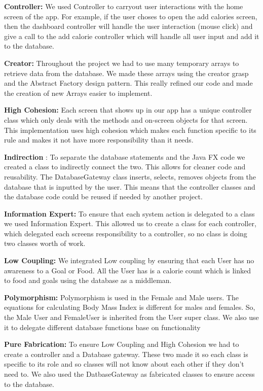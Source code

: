 \documentclass[10pt]{article}
\begin{document}
\textbf{Controller:} We used Controller to carryout user interactions
with the home screen of the app. For example, if the user choses to open
the add calories screen, then the dashboard controller will handle the
user interaction (mouse click) and give a call to the add calorie
controller which will handle all user input and add it to the database.

\textbf{Creator:} Throughout the project we had to use many temporary
arrays to retrieve data from the database. We made these arrays using
the creator grasp and the Abstract Factory design pattern. This really
refined our code and made the creation of new Arrays easier to
implement.

\textbf{High Cohesion:} Each screen that shows up in our app has a
unique controller class which only deals with the methods and on-screen
objects for that screen. This implementation uses high cohesion which
makes each function specific to its rule and makes it not have more
responsibility than it needs.

\textbf{Indirection} : To separate the database statements and the Java
FX code we created a class to indirectly connect the two. This allows
for cleaner code and reusability. The DatabaseGateway class inserts,
selects, removes objects from the database that is inputted by the user.
This means that the controller classes and the database code could be
reused if needed by another project.

\textbf{Information Expert:} To ensure that each system action is
delegated to a class we used Information Expert. This allowed us to
create a class for each controller, which delegated each screens
responsibility to a controller, so no class is doing two classes worth
of work.

\textbf{Low Coupling:} We integrated Low coupling by ensuring that each
User has no awareness to a Goal or Food. All the User has is a calorie
count which is linked to food and goals using the database as a
middleman.

\textbf{Polymorphism:} Polymorphism is used in the Female and Male
users. The equations for calculating Body Mass Index is different for
males and females. So, the Male User and FemaleUser is inherited from
the User super class. We also use it to delegate different database
functions base on functionality

\textbf{Pure Fabrication:} To ensure Low Coupling and High Cohesion we
had to create a controller and a Database gateway. These two made it so
each class is specific to its role and so classes will not know about
each other if they don't need to. We also used the DatbaseGateway as
fabricated classes to ensure access to the database.
\end{document}
